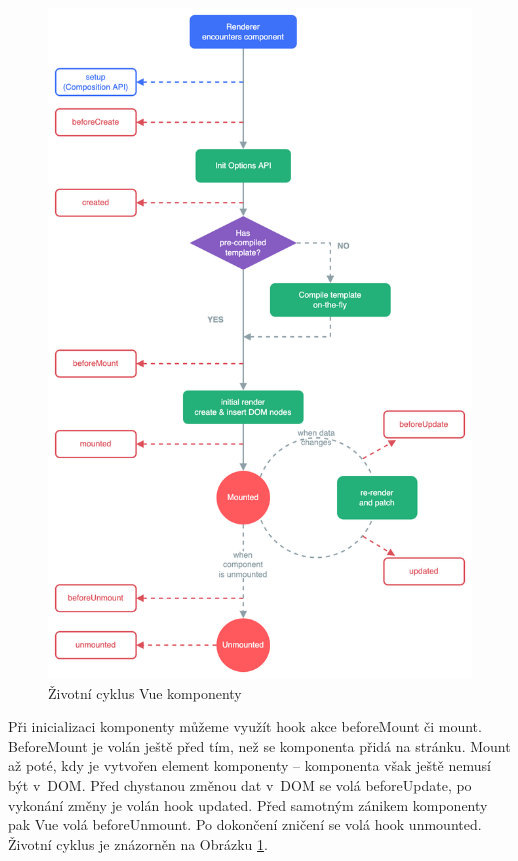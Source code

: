 \begin{figure}[hptb]
	\centering
		\includegraphics[width=.9\textwidth]{images/vuelifecycle.png}
	\caption[Životní cyklus Vue komponenty]{Životní cyklus Vue komponenty \cite{vue}}
	\label{fig:vuelifecycle}
\end{figure}

Při inicializaci komponenty můžeme využít hook akce beforeMount či mount. BeforeMount je volán ještě před tím, než se komponenta přidá na stránku. 
Mount až poté, kdy je vytvořen element komponenty -- komponenta však ještě nemusí být v~DOM. 
Před chystanou změnou dat v~DOM se volá beforeUpdate, po vykonání změny je volán hook updated. Před samotným zánikem komponenty pak Vue volá beforeUnmount. 
Po dokončení zničení se volá hook unmounted. Životní cyklus je znázorněn na Obrázku \ref{fig:vuelifecycle}.\cite{vuemacrae,vue}

